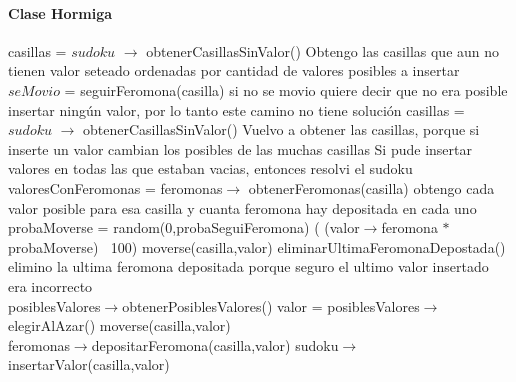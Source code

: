 \paragraph{Clase Hormiga}
\begin{algorithmic}[1]


\State casillas = $sudoku$ $\to$ obtenerCasillasSinValor()
\Comment Obtengo las casillas que aun no tienen valor seteado ordenadas por cantidad de valores posibles a insertar
	\State $seMovio$ = seguirFeromona(casilla)	
			\Comment si no se movio quiere decir que no era posible insertar ningún valor, por lo tanto este camino no tiene soluci\'on
		\EndIf
	\EndIf
	\State casillas = $sudoku$ $\to$ obtenerCasillasSinValor()
	\Comment Vuelvo a obtener las casillas, porque si inserte un valor cambian los posibles de las muchas casillas
\EndWhile
{}
\Comment Si pude insertar valores en todas las que estaban vacias, entonces resolvi el sudoku
\EndFunction
\\
	\State valoresConFeromonas = feromonas$\to$ obtenerFeromonas(casilla)
	\Comment obtengo cada valor posible para esa casilla y cuanta feromona hay depositada en cada uno
		\State probaMoverse = random(0,probaSeguiFeromona)
		\If( (valor$\to$feromona $\ast$ probaMoverse) $\>$ 100)
			\State moverse(casilla,valor)
			\State eliminarUltimaFeromonaDepostada() \Comment elimino la ultima feromona depositada porque seguro el ultimo valor insertado era incorrecto
		\EndIf
	\EndWhile
\EndFunction
\\
	\State posiblesValores$\to$obtenerPosiblesValores()
		\State valor = posiblesValores$\to$elegirAlAzar()	
		\State moverse(casilla,valor)
	\EndIf
\EndFunction
\\
	\State feromonas$\to$depositarFeromona(casilla,valor)
	\State sudoku$\to$insertarValor(casilla,valor)
\EndFunction
\end{algorithmic}


